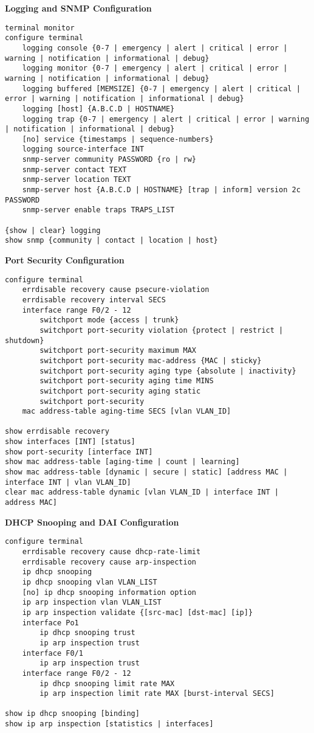 \documentclass[12pt]{article}
\begin{document}
	\textbf{Logging and SNMP Configuration}
	\begin{lstlisting}
terminal monitor
configure terminal
	logging console {0-7 | emergency | alert | critical | error | warning | notification | informational | debug}
	logging monitor {0-7 | emergency | alert | critical | error | warning | notification | informational | debug}
	logging buffered [MEMSIZE] {0-7 | emergency | alert | critical | error | warning | notification | informational | debug}
	logging [host] {A.B.C.D | HOSTNAME}
	logging trap {0-7 | emergency | alert | critical | error | warning | notification | informational | debug}
	[no] service {timestamps | sequence-numbers}
	logging source-interface INT
	snmp-server community PASSWORD {ro | rw}
	snmp-server contact TEXT
	snmp-server location TEXT
	snmp-server host {A.B.C.D | HOSTNAME} [trap | inform] version 2c PASSWORD
	snmp-server enable traps TRAPS_LIST

{show | clear} logging
show snmp {community | contact | location | host}
	\end{lstlisting}

	\textbf{Port Security Configuration}
	\begin{lstlisting}
configure terminal
	errdisable recovery cause psecure-violation
	errdisable recovery interval SECS
	interface range F0/2 - 12
		switchport mode {access | trunk}
		switchport port-security violation {protect | restrict | shutdown}
		switchport port-security maximum MAX
		switchport port-security mac-address {MAC | sticky}
		switchport port-security aging type {absolute | inactivity}
		switchport port-security aging time MINS
		switchport port-security aging static
		switchport port-security
	mac address-table aging-time SECS [vlan VLAN_ID]

show errdisable recovery
show interfaces [INT] [status]
show port-security [interface INT]
show mac address-table [aging-time | count | learning]
show mac address-table [dynamic | secure | static] [address MAC | interface INT | vlan VLAN_ID]
clear mac address-table dynamic [vlan VLAN_ID | interface INT | address MAC]
	\end{lstlisting}

	\textbf{DHCP Snooping and DAI Configuration}
	\begin{lstlisting}
configure terminal
	errdisable recovery cause dhcp-rate-limit
	errdisable recovery cause arp-inspection
	ip dhcp snooping
	ip dhcp snooping vlan VLAN_LIST
	[no] ip dhcp snooping information option
	ip arp inspection vlan VLAN_LIST
	ip arp inspection validate {[src-mac] [dst-mac] [ip]}
	interface Po1
		ip dhcp snooping trust
		ip arp inspection trust
	interface F0/1
		ip arp inspection trust
	interface range F0/2 - 12
		ip dhcp snooping limit rate MAX
		ip arp inspection limit rate MAX [burst-interval SECS]

show ip dhcp snooping [binding]
show ip arp inspection [statistics | interfaces]
	\end{lstlisting}
\end{document}
